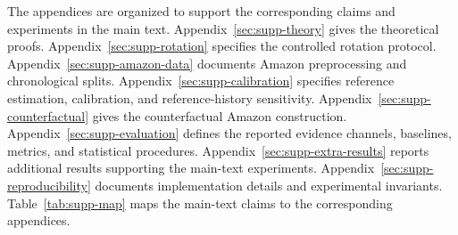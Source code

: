 The appendices are organized to support the corresponding claims and
experiments in the main text.
Appendix~\ref{sec:supp-theory} gives the theoretical proofs.
Appendix~\ref{sec:supp-rotation} specifies the controlled rotation protocol.
Appendix~\ref{sec:supp-amazon-data} documents Amazon preprocessing and
chronological splits.
Appendix~\ref{sec:supp-calibration} specifies reference estimation,
calibration, and reference-history sensitivity.
Appendix~\ref{sec:supp-counterfactual} gives the counterfactual Amazon
construction.
Appendix~\ref{sec:supp-evaluation} defines the reported evidence channels,
baselines, metrics, and statistical procedures.
Appendix~\ref{sec:supp-extra-results} reports additional results supporting the
main-text experiments.
Appendix~\ref{sec:supp-reproducibility} documents implementation details and
experimental invariants. Table~\ref{tab:supp-map} maps the main-text claims to
the corresponding appendices.

